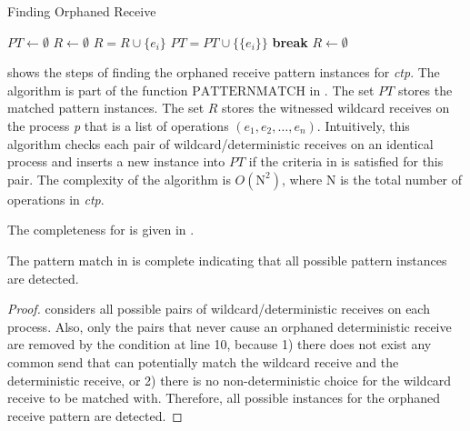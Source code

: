 \begin{algorithm}
\caption{Finding Orphaned Receive}\label{algo:mismatch}
\begin{algorithmic}[1]
\State $\mathit{PT} \gets \emptyset$
\State $\mathit{R} \gets \emptyset$
\State $\mathit{R} = \mathit{R} \cup \{e_i\}$
\EndIf
{}
\State $\mathit{PT} = \mathit{PT} \cup \{\{e_i\}\}$
\State \textbf{break}
\EndIf
\EndFor
\EndIf
\EndFor
\State $\mathit{R} \gets \emptyset$
\EndFor
\end{algorithmic}
\end{algorithm}

 shows the steps of finding the orphaned receive pattern instances for \textit{ctp}. The algorithm is part of the function $\mathrm{PATTERNMATCH}$ in .  
The set $\mathit{PT}$ stores the matched pattern instances.
The set $\mathit{R}$ stores the witnessed wildcard receives on the process \textit{p} that is a list of operations $(e_1, e_2, \dots, e_n)$. 
Intuitively, this algorithm checks each pair of wildcard/deterministic receives on an identical process and inserts a new instance into $\mathit{PT}$ if the criteria in  is satisfied for this pair. 
The complexity of the algorithm is $O(\mathrm{N}^2)$, where $\mathrm{N}$ is the total number of operations in \textit{ctp}. 

The completeness for  is given in . 

\begin{lemma}
\label{lemma:pmorphaned}
The pattern match in  is complete indicating that all possible pattern instances are detected.
\end{lemma}
\begin{proof}
 considers all possible pairs of wildcard/deterministic receives on each process. Also, only the pairs that never cause an orphaned deterministic receive are removed by the condition at line 10, because 1) there does not exist any common send that can potentially match the wildcard receive and the deterministic receive, or 2) there is no non-deterministic choice for the wildcard receive to be matched with. 
Therefore, all possible instances for the orphaned receive pattern are detected. 
\end{proof}

